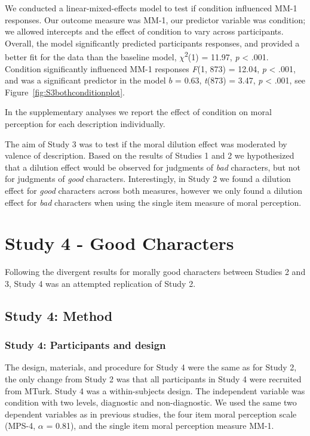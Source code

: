 \documentclass[
  english,
  man,floatsintext]{apa7}
\begin{document}
We conducted a linear-mixed-effects model to test if condition influenced MM-1 responses. Our outcome measure was MM-1, our predictor variable was condition; we allowed intercepts and the effect of condition to vary across participants. Overall, the model significantly predicted participants responses, and provided a better fit for the data than the baseline model, \(\chi\)\textsuperscript{2}(1) = 11.97, \emph{p} \textless{} .001. Condition significantly influenced MM-1 responses \emph{F}(1, 873) = 12.04, \emph{p} \textless{} .001, and was a significant predictor in the model \(b\) = 0.63, \emph{t}(873) = 3.47, \emph{p} \textless{} .001, see Figure~\ref{fig:S3bothconditionplot}.

In the supplementary analyses we report the effect of condition on moral perception for each description individually.

The aim of Study 3 was to test if the moral dilution effect was moderated by valence of description. Based on the results of Studies 1 and 2 we hypothesized that a dilution effect would be observed for judgments of \emph{bad} characters, but not for judgments of \emph{good} characters. Interestingly, in Study 2 we found a dilution effect for \emph{good} characters across both measures, however we only found a dilution effect for \emph{bad} characters when using the single item measure of moral perception.

\hypertarget{study-4---good-characters}{%
\section{Study 4 - Good Characters}\label{study-4---good-characters}}

Following the divergent results for morally good characters between Studies 2 and 3, Study 4 was an attempted replication of Study 2.

\hypertarget{study-4-method}{%
\subsection{Study 4: Method}\label{study-4-method}}

\hypertarget{study-4-participants-and-design}{%
\subsubsection{Study 4: Participants and design}\label{study-4-participants-and-design}}

The design, materials, and procedure for Study 4 were the same as for Study 2, the only change from Study 2 was that all participants in Study 4 were recruited from MTurk. Study 4 was a within-subjects design. The independent variable was condition with two levels, diagnostic and non-diagnostic. We used the same two dependent variables as in previous studies, the four item moral perception scale (MPS-4, \(\alpha\) = 0.81), and the single item moral perception measure MM-1.
\end{document}
